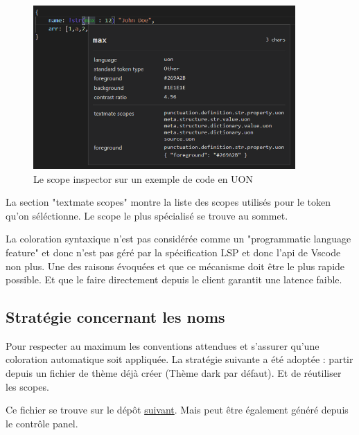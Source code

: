 \documentclass[
    iict, %
    il, %
]{heig-tb}
\begin{document}
\begin{figure}[!h]
    \begin{center}
        \includegraphics[width=10cm]{assets/figures/scope-inspector.png}
    \end{center}
    \caption[Scope inspector]{\label{basic-uon} Le scope inspector sur un exemple de code en UON}
\end{figure}

La section "textmate scopes" montre la liste des scopes utilisés pour le token qu'on séléctionne. Le scope le plus spécialisé se trouve au sommet.

La coloration syntaxique n'est pas considérée comme un "programmatic language feature" et donc n'est pas géré par la spécification LSP et donc l'api de Vscode non plus. Une des raisons évoquées et que ce mécanisme doit être le plus rapide possible. Et que le faire directement depuis le client garantit une latence faible.

\subsection{Stratégie concernant les noms}
Pour respecter au maximum les conventions attendues et s'assurer qu'une coloration automatique soit appliquée. La stratégie suivante a été adoptée : partir depuis un fichier de thème déjà créer (Thème dark par défaut). Et de réutiliser les scopes.

Ce fichier se trouve sur le dépôt \href{https://github.com/microsoft/vscode/blob/main/extensions/theme-defaults/themes/dark_vs.json}{suivant}.
Mais peut être également généré depuis le contrôle panel.
\end{document}
